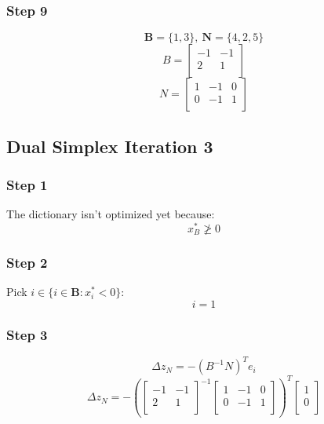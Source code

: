 \documentclass[14pt]{extarticle}
\begin{document}
\subsubsection*{Step 9}
\[
    \boldsymbol{B} = \{1, 3\},\ \boldsymbol{N} = \{4, 2, 5\}
\]
\[
    B = \begin{bmatrix}
        -1 & -1 \\
        2 & 1 \\
    \end{bmatrix}
\]
\[
    N = \begin{bmatrix}
        1 & -1 & 0 \\
        0 & -1 & 1 \\
    \end{bmatrix}
\]

\subsection*{Dual Simplex Iteration 3}
\subsubsection*{Step 1}
The dictionary isn't optimized yet because:
\[
    x^*_B \ngeq 0
\]

\subsubsection*{Step 2}
Pick $i \in \{i \in \boldsymbol{B}: x^*_i < 0\}$:
\[
    i = 1
\]

\subsubsection*{Step 3}
\[
    \Delta z_N = -(B^{-1}N)^T e_i
\]
\[
    \Delta z_N = -\left(\begin{bmatrix}
        -1 & -1 \\
        2 & 1 \\
    \end{bmatrix}^{-1}
    \begin{bmatrix}
        1 & -1 & 0 \\
        0 & -1 & 1 \\
    \end{bmatrix}\right)^T
    \begin{bmatrix}
        1 \\
        0 \\
    \end{bmatrix}
\]
\end{document}
